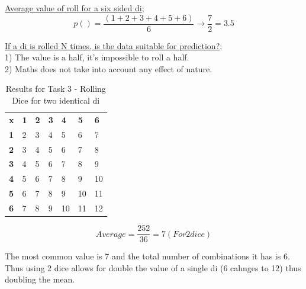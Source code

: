 \documentclass[11pt]{article}
\begin{document}
\bigskip

\underline{Average value of roll for a six sided di};
\begin{equation} \label{Q3.2}
p() = \dfrac{(1+2+3+4+5+6)}{6} \rightarrow \dfrac{7}{2} = 3.5
\end{equation}

\bigskip

\underline{If a di is rolled N times, is the data suitable for prediction?}; \\
1) The value is a half, it's impossible to roll a half. \\
2) Maths does not take into account any effect of nature. \\

\begin{table}[H]
\centering
\caption{Results for Task 3 - Rolling Dice for two identical di}
\label{Dice Rolling table no.1}
\begin{tabular}{lllllll}
\textbf{x} & \textbf{1} & \textbf{2} & \textbf{3} & \textbf{4} & \textbf{5} & \textbf{6} \\
\textbf{1} & 2          & 3          & 4          & 5          & 6          & 7          \\
\textbf{2} & 3          & 4          & 5          & 6          & 7          & 8          \\
\textbf{3} & 4          & 5          & 6          & 7          & 8          & 9          \\
\textbf{4} & 5          & 6          & 7          & 8          & 9          & 10         \\
\textbf{5} & 6          & 7          & 8          & 9          & 10         & 11         \\
\textbf{6} & 7          & 8          & 9          & 10         & 11         & 12        
\end{tabular}
\end{table}

\begin{equation} \label{Q3.1}
Average = \dfrac{252}{36} = 7 (For 2 dice)
\end{equation}

\bigskip

The most common value is 7 and the total number of combinations it has is 6. Thus using 2 dice allows for double the value of a single di (6 cahnges to 12) thus doubling the mean. \\
\end{document}
